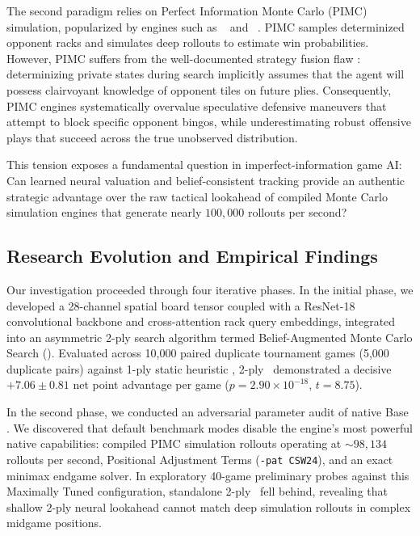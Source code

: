 The second paradigm relies on Perfect Information Monte Carlo (PIMC) simulation, popularized by engines such as \quackle\ \citep{olaughlin2006quackle} and \macondo\ \citep{del2022macondo}. PIMC samples determinized opponent racks and simulates deep rollouts to estimate win probabilities. However, PIMC suffers from the well-documented strategy fusion flaw \citep{sokota2026scalable}: determinizing private states during search implicitly assumes that the agent will possess clairvoyant knowledge of opponent tiles on future plies. Consequently, PIMC engines systematically overvalue speculative defensive maneuvers that attempt to block specific opponent bingos, while underestimating robust offensive plays that succeed across the true unobserved distribution.

This tension exposes a fundamental question in imperfect-information game AI: Can learned neural valuation and belief-consistent tracking provide an authentic strategic advantage over the raw tactical lookahead of compiled Monte Carlo simulation engines that generate nearly $100,000$ rollouts per second?

\subsection{Research Evolution and Empirical Findings}

Our investigation proceeded through four iterative phases. In the initial phase, we developed a 28-channel spatial board tensor coupled with a ResNet-18 convolutional backbone and cross-attention rack query embeddings, integrated into an asymmetric 2-ply search algorithm termed Belief-Augmented Monte Carlo Search (\bams). Evaluated across 10,000 paired duplicate tournament games (5,000 duplicate pairs) against 1-ply static heuristic \magpie, 2-ply \bams\ demonstrated a decisive $+7.06 \pm 0.81$ net point advantage per game ($p = 2.90 \times 10^{-18}$, $t = 8.75$).

In the second phase, we conducted an adversarial parameter audit of native Base \magpie. We discovered that default benchmark modes disable the engine's most powerful native capabilities: compiled PIMC simulation rollouts operating at $\sim 98,134$ rollouts per second, Positional Adjustment Terms (\texttt{-pat CSW24}), and an exact minimax endgame solver. In exploratory 40-game preliminary probes against this Maximally Tuned configuration, standalone 2-ply \bams\ fell behind, revealing that shallow 2-ply neural lookahead cannot match deep simulation rollouts in complex midgame positions.

